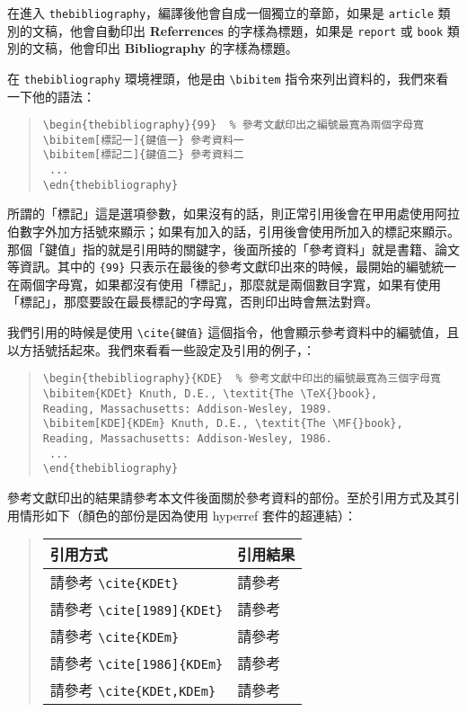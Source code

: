 在進入 \texttt{thebibliography}，編譯後他會自成一個獨立的章節，如果是 \texttt{article} 類別的文稿，他會自動印出 \textbf{Referrences} 的字樣為標題，如果是 \texttt{report} 或 \texttt{book} 類別的文稿，他會印出 \textbf{Bibliography} 的字樣為標題。

在 \texttt{thebibliography} 環境裡頭，他是由 \verb+\bibitem+ 指令來列出資料的，我們來看一下他的語法：

\begin{quote}
  \begin{verbatim}
\begin{thebibliography}{99}  % 參考文獻印出之編號最寬為兩個字母寬
\bibitem[標記一]{鍵值一} 參考資料一
\bibitem[標記二]{鍵值二} 參考資料二
 ...
\edn{thebibliography}
\end{verbatim}
\end{quote}

所謂的「標記」這是選項參數，如果沒有的話，則正常引用後會在甲用處使用阿拉伯數字外加方括號來顯示；如果有加入的話，引用後會使用所加入的標記來顯示。那個「鍵值」指的就是引用時的關鍵字，後面所接的「參考資料」就是書籍、論文等資訊。其中的 \verb+{99}+ 只表示在最後的參考文獻印出來的時候，最開始的編號統一在兩個字母寬，如果都沒有使用「標記」，那麼就是兩個數目字寬，如果有使用「標記」，那麼要設在最長標記的字母寬，否則印出時會無法對齊。

我們引用的時候是使用 \verb+\cite{鍵值}+ 這個指令，他會顯示參考資料中的編號值，且以方括號括起來。我們來看看一些設定及引用的例子，：

\begin{quote}
  \begin{verbatim}
\begin{thebibliography}{KDE}  % 參考文獻中印出的編號最寬為三個字母寬
\bibitem{KDEt} Knuth, D.E., \textit{The \TeX{}book},
Reading, Massachusetts: Addison-Wesley, 1989.
\bibitem[KDE]{KDEm} Knuth, D.E., \textit{The \MF{}book},
Reading, Massachusetts: Addison-Wesley, 1986.
 ...
\end{thebibliography}
\end{verbatim}
\end{quote}

參考文獻印出的結果請參考本文件後面關於參考資料的部份。至於引用方式及其引用情形如下（顏色的部份是因為使用 {\sffamily hyperref} 套件的超連結）：

\begin{quote}
  \begin{tabular}{ll}
    引用方式                       & 引用結果                 \\
    \hline
    請參考 \verb+\cite{KDEt}+ & 請參考 \cite{KDEt}       \\
    請參考 \verb+\cite[1989]{KDEt}+ & 請參考 \cite[1989]{KDEt} \\
    請參考 \verb+\cite{KDEm}+ & 請參考 \cite{KDEm}       \\
    請參考 \verb+\cite[1986]{KDEm}+ & 請參考 \cite[1986]{KDEm} \\
    請參考 \verb+\cite{KDEt,KDEm}+ & 請參考 \cite{KDEt,KDEm}
  \end{tabular}
\end{quote}

